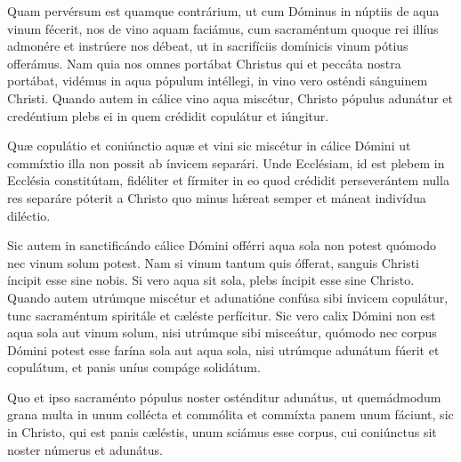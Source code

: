 {\noindent Quam pervérsum est quamque contrárium, ut cum Dóminus in núptiis de aqua vinum fécerit, nos de vino aquam faciámus, cum sacraméntum quoque rei illíus admonére et instrúere nos débeat, ut in sacrifíciis domínicis vinum pótius offerámus. Nam quia nos omnes portábat Christus qui et peccáta nostra portábat, vidémus in aqua pópulum intéllegi, in vino vero osténdi sánguinem Christi. Quando autem in cálice vino aqua miscétur, Christo pópulus adunátur et credéntium plebs ei in quem crédidit copulátur et iúngitur.

\noindent Quæ copulátio et coniúnctio aquæ et vini sic miscétur in cálice Dómini ut commíxtio illa non possit ab ínvicem separári. Unde Ecclésiam, id est plebem in Ecclésia constitútam, fidéliter et fírmiter in eo quod crédidit perseverántem nulla res separáre póterit a Christo quo minus hǽreat semper et máneat indivídua diléctio.

\noindent Sic autem in sanctificándo cálice Dómini offérri aqua sola non potest quómodo nec vinum solum potest. Nam si vinum tantum quis ófferat, sanguis Christi íncipit esse sine nobis. Si vero aqua sit sola, plebs íncipit esse sine Christo. Quando autem utrúmque miscétur et adunatióne confúsa sibi ínvicem copulátur, tunc sacraméntum spiritále et cæléste perfícitur. Sic vero calix Dómini non est aqua sola aut vinum solum, nisi utrúmque sibi misceátur, quómodo nec corpus Dómini potest esse farína sola aut aqua sola, nisi utrúmque adunátum fúerit et copulátum, et panis uníus compáge solidátum.

\noindent Quo et ipso sacraménto pópulus noster osténditur adunátus, ut quemádmodum grana multa in unum collécta et commólita et commíxta panem unum fáciunt, sic in Christo, qui est panis cæléstis, unum sciámus esse corpus, cui coniúnctus sit noster númerus et adunátus.

\vfill
\pagebreak

 

\vspace{-5mm}


\vfill
\pagebreak
}
\newcommand{\hymnuslaudes}{\pars{Hymnus} \scriptura{Alcuinus (\olddag{} 804)}

\cuminitiali{IV}{temporalia/hym-EcceIam.gtex}}
\newcommand{\benedictus}{\pars{Canticum Zachariæ.} \scriptura{Io. 2, 3.7.9; \textbf{H81}}

\vspace{-4mm}

\antiphona{I f}{temporalia/ant-deficientevino.gtex}

\vspace{-2mm}

\scriptura{Lc. 1, 68-79}

\vspace{-2mm}

\cantusSineNeumas
\initiumpsalmi{temporalia/benedictus-initium-isoll-f-auto.gtex}


 \Abardot{}}


